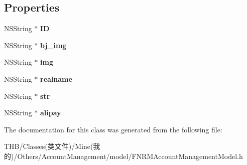 \subsection*{Properties}
\begin{DoxyCompactItemize}
\item 
\mbox{\label{interface_f_n_r_m_account_management_model_ab9d32eaa254ff1b210e8feccd292aa03}} 
N\+S\+String $\ast$ {\bfseries ID}
\item 
\mbox{\label{interface_f_n_r_m_account_management_model_a4544b1d0d980375548c09bd2f6b1068a}} 
N\+S\+String $\ast$ {\bfseries bj\+\_\+img}
\item 
\mbox{\label{interface_f_n_r_m_account_management_model_acf469fdf7b3b7ce2c84467eed704854c}} 
N\+S\+String $\ast$ {\bfseries img}
\item 
\mbox{\label{interface_f_n_r_m_account_management_model_a79966704b6f2b9e9ea0a86ae79cabb66}} 
N\+S\+String $\ast$ {\bfseries realname}
\item 
\mbox{\label{interface_f_n_r_m_account_management_model_ac80edddc032ba6a4b1f282b583fdeeac}} 
N\+S\+String $\ast$ {\bfseries str}
\item 
\mbox{\label{interface_f_n_r_m_account_management_model_a8e04f6ce6eeecbc7bc5abbb45ce5fd2b}} 
N\+S\+String $\ast$ {\bfseries alipay}
\end{DoxyCompactItemize}


The documentation for this class was generated from the following file\+:\begin{DoxyCompactItemize}
\item 
T\+H\+B/\+Classes(类文件)/\+Mine(我的)/\+Others/\+Account\+Management/model/F\+N\+R\+M\+Account\+Management\+Model.\+h\end{DoxyCompactItemize}
